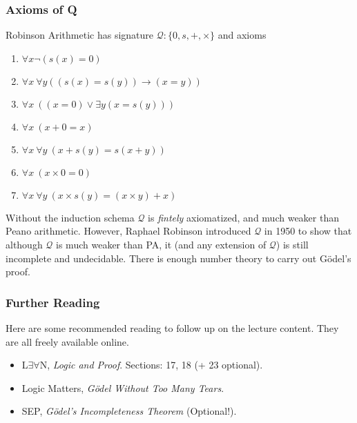 \documentclass{beamer}
\begin{document}
\begin{frame}
	\frametitle{Axioms of Q}
	
	Robinson Arithmetic has signature $\mathcal{Q}: \{0,s,+,\times\}$ and axioms
	
	\begin{enumerate}
		\item $\forall x \lnot(s(x) = 0)$
		\item $\forall x \ \forall y ((s(x) = s(y)) \to (x = y))$
		\item $\forall x \ ((x = 0) \lor \exists y (x = s(y)))$
		\item $\forall x \ (x + 0 = x)$
		\item $\forall x \ \forall y \ (x + s(y) = s(x + y))$
		\item $\forall x \ (x \times 0 = 0)$
		\item $\forall x \ \forall y \ (x \times s(y) = (x \times y) + x)$
	\end{enumerate}
	
	\vspace{0.2cm}
	
	Without the induction schema $\mathcal{Q}$ is \emph{fintely} axiomatized, and much weaker than Peano arithmetic. However, Raphael Robinson introduced $\mathcal{Q}$ in 1950 to show that although $\mathcal{Q}$ is much weaker than PA, it (and any extension of $\mathcal{Q}$) is still incomplete and undecidable. There is enough number theory to carry out G\"{o}del's proof. 
	
	
\end{frame}

\begin{frame}
	\frametitle{Further Reading}
	
	Here are some recommended reading to follow up on the lecture content. They are all freely available online. 
	
	\vspace{0.5cm}
	
	\begin{itemize}
		\item L$\exists \forall$N, \emph{Logic and Proof}. Sections: 17, 18 (+ 23 optional).
		\item Logic Matters, \emph{G\"{o}del Without Too Many Tears}.
		\item SEP, \emph{G\"{o}del's Incompleteness Theorem} (Optional!).
	\end{itemize}
	
\end{frame}
\end{document}
